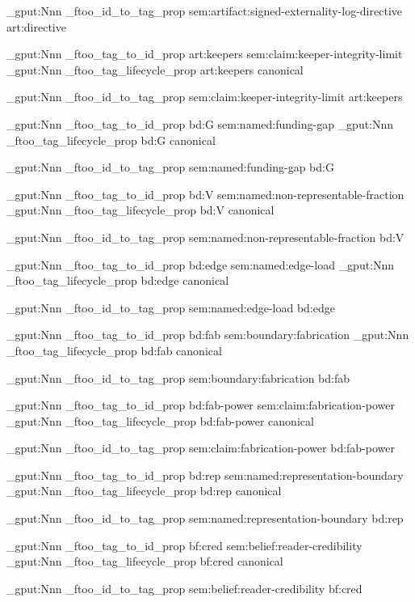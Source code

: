 \prop_gput:Nnn \g_ftoo_id_to_tag_prop { sem:artifact:signed-externality-log-directive } { art:directive }


\prop_gput:Nnn \g_ftoo_tag_to_id_prop { art:keepers } { sem:claim:keeper-integrity-limit }
\prop_gput:Nnn \g_ftoo_tag_lifecycle_prop { art:keepers } { canonical }

\prop_gput:Nnn \g_ftoo_id_to_tag_prop { sem:claim:keeper-integrity-limit } { art:keepers }


\prop_gput:Nnn \g_ftoo_tag_to_id_prop { bd:G } { sem:named:funding-gap }
\prop_gput:Nnn \g_ftoo_tag_lifecycle_prop { bd:G } { canonical }

\prop_gput:Nnn \g_ftoo_id_to_tag_prop { sem:named:funding-gap } { bd:G }


\prop_gput:Nnn \g_ftoo_tag_to_id_prop { bd:V } { sem:named:non-representable-fraction }
\prop_gput:Nnn \g_ftoo_tag_lifecycle_prop { bd:V } { canonical }

\prop_gput:Nnn \g_ftoo_id_to_tag_prop { sem:named:non-representable-fraction } { bd:V }


\prop_gput:Nnn \g_ftoo_tag_to_id_prop { bd:edge } { sem:named:edge-load }
\prop_gput:Nnn \g_ftoo_tag_lifecycle_prop { bd:edge } { canonical }

\prop_gput:Nnn \g_ftoo_id_to_tag_prop { sem:named:edge-load } { bd:edge }


\prop_gput:Nnn \g_ftoo_tag_to_id_prop { bd:fab } { sem:boundary:fabrication }
\prop_gput:Nnn \g_ftoo_tag_lifecycle_prop { bd:fab } { canonical }

\prop_gput:Nnn \g_ftoo_id_to_tag_prop { sem:boundary:fabrication } { bd:fab }


\prop_gput:Nnn \g_ftoo_tag_to_id_prop { bd:fab-power } { sem:claim:fabrication-power }
\prop_gput:Nnn \g_ftoo_tag_lifecycle_prop { bd:fab-power } { canonical }

\prop_gput:Nnn \g_ftoo_id_to_tag_prop { sem:claim:fabrication-power } { bd:fab-power }


\prop_gput:Nnn \g_ftoo_tag_to_id_prop { bd:rep } { sem:named:representation-boundary }
\prop_gput:Nnn \g_ftoo_tag_lifecycle_prop { bd:rep } { canonical }

\prop_gput:Nnn \g_ftoo_id_to_tag_prop { sem:named:representation-boundary } { bd:rep }


\prop_gput:Nnn \g_ftoo_tag_to_id_prop { bf:cred } { sem:belief:reader-credibility }
\prop_gput:Nnn \g_ftoo_tag_lifecycle_prop { bf:cred } { canonical }

\prop_gput:Nnn \g_ftoo_id_to_tag_prop { sem:belief:reader-credibility } { bf:cred }


